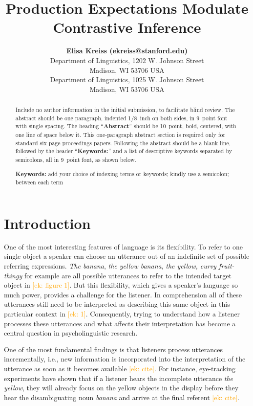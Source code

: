 \documentclass[10pt,letterpaper]{article}
\title{Production Expectations Modulate Contrastive Inference}
\author{{\large \bf Elisa Kreiss (ekreiss@stanford.edu)} \\
  Department of Linguistics, 1202 W. Johnson Street \\
  Madison, WI 53706 USA
  \AND {\large \bf Judith Degen (jdegen@stanford.edu)} \\
  Department of Linguistics, 1025 W. Johnson Street \\
  Madison, WI 53706 USA}
\newcommand{\ek}[1]{\textcolor{Orange}{[ek: #1]}}
\begin{document}
\maketitle

\begin{abstract}
Include no author information in the initial submission, to facilitate
blind review.  The abstract should be one paragraph, indented 1/8~inch on both sides,
in 9~point font with single spacing. The heading ``{\bf Abstract}''
should be 10~point, bold, centered, with one line of space below
it. This one-paragraph abstract section is required only for standard
six page proceedings papers. Following the abstract should be a blank
line, followed by the header ``{\bf Keywords:}'' and a list of
descriptive keywords separated by semicolons, all in 9~point font, as
shown below.

\textbf{Keywords:} 
add your choice of indexing terms or keywords; kindly use a
semicolon; between each term
\end{abstract}

\section{Introduction}

One of the most interesting features of language is its flexibility. To refer to one single object a speaker can choose an utterance out of an indefinite set of possible referring expressions. \textit{The banana}, \textit{the yellow banana}, \textit{the yellow, curvy fruit-thingy} for example are all possible utterances to refer to the intended target object in \ek{figure 1}. But this flexibility, which gives a speaker's language so much power, provides a challenge for the listener. In comprehension all of these utterances still need to be interpreted as describing this same object in this particular context in \ek{1}. Consequently, trying to understand how a listener processes these utterances and what affects their interpretation has become a central question in psycholinguistic research.

One of the most fundamental findings is that listeners process utterances incrementally, i.e., new information is incorporated into the interpretation of the utterance as soon as it becomes available \ek{cite}. For instance, eye-tracking experiments have shown that if a listener hears the incomplete utterance \textit{the yellow}, they will already focus on the yellow objects in the display before they hear the disambiguating noun \textit{banana} and arrive at the final referent \ek{cite}. 
\end{document}
